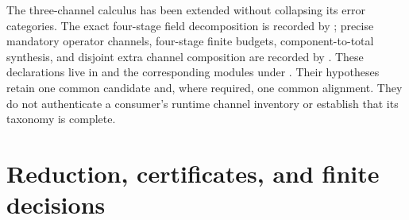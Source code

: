 The three-channel calculus has been extended without collapsing its error categories.  The exact
four-stage field decomposition is recorded by ; precise mandatory
operator channels, four-stage finite budgets, component-to-total synthesis, and disjoint extra
channel composition are recorded by .  These declarations live in
 and the corresponding
modules under .  Their hypotheses retain one common
candidate and, where required, one common alignment.  They do not authenticate a consumer's
runtime channel inventory or establish that its taxonomy is complete.

\section{Reduction, certificates, and finite decisions}

